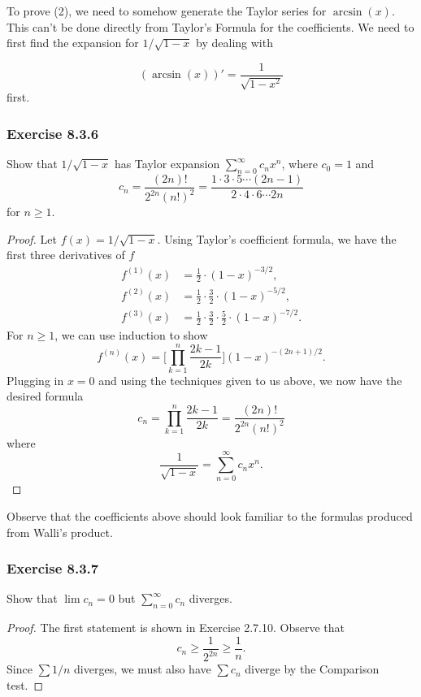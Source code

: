 To prove (2), we need to somehow generate the Taylor series for \( \arcsin(x)  \). This can't be done directly from Taylor's Formula for the coefficients. We need to first find the expansion for \( 1 / \sqrt{ 1 - x  }  \) by dealing with  





\[  (\arcsin(x))' = \frac{ 1 }{ \sqrt{ 1 - x^{2} }  } \] first. 
\subsubsection{Exercise 8.3.6} Show that \( 1 / \sqrt{ 1 - x  }  \) has Taylor expansion \( \sum_{ n=0 }^{ \infty  } c_{n} x^{n}  \), where \( c_{0} = 1  \) and 
\[  c_{n} = \frac{ (2n)!  }{  2^{2n} (n!)^{2}  } = \frac{ 1 \cdot 3 \cdot 5 \dotsb (2n-1) }{ 2 \cdot 4 \cdot 6 \dotsb 2n }  \] for \( n \geq 1  \).
\begin{proof}
Let \( f(x) = 1 / \sqrt{ 1 - x  }  \). Using Taylor's coefficient formula, we have the first three derivatives of \( f  \)
\begin{align*}
    f^{(1)}(x) &= \frac{ 1 }{ 2 } \cdot (1 - x )^{-3/2}, \\
    f^{(2)}(x) &= \frac{ 1  }{ 2 }  \cdot \frac{ 3 }{ 2 } \cdot  (1-x)^{-5/2}, \\
    f^{(3)}(x) &= \frac{ 1 }{ 2 }  \cdot \frac{ 3 }{ 2 }  \cdot \frac{ 5 }{ 2 } \cdot (1- x)^{-7/2}.
\end{align*}
For \( n  \geq 1 \), we can use induction to show  
\[  f^{(n)}(x) =  \Big[ \prod_{k=1}^{n} \frac{ 2k-1 }{ 2k }   \Big] (1 -x )^{-(2n+1)/2}. \] Plugging in \( x = 0  \) and using the techniques given to us above, we now have the desired formula
\[  c_{n} = \prod_{k=1}^{n} \frac{ 2k-1 }{ 2k } = \frac{ (2n)!  }{ 2^{2n}  (n!)^2   }  \] 
where 
\[  \frac{ 1 }{ \sqrt{ 1-x  }  }  = \sum_{ n=0 }^{ \infty  } c_{n} x^{n}. \]

\end{proof}

Observe that the coefficients above should look familiar to the formulas produced from Walli's product.

\subsubsection{Exercise 8.3.7} Show that \( \lim c_{n} =  0  \) but \( \sum_{ n=0  }^{ \infty  } c_{n}  \) diverges.
\begin{proof}
The first statement is shown in Exercise 2.7.10. Observe that 
\[  c_{n} \geq \frac{ 1 }{ 2^{2n} } \geq \frac{ 1 }{ n }. \] Since \( \sum 1 / n  \) diverges, we must also have \( \sum c_{n}   \) diverge by the Comparison test. 
\end{proof}

